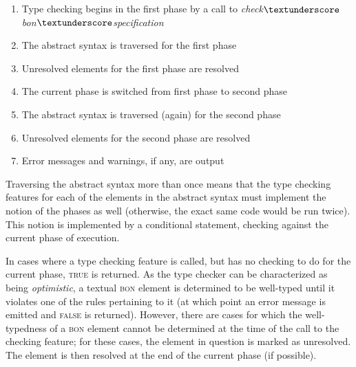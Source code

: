 \begin{enumerate}
\item Type checking begins in the first phase by a call to \textit{check$\textunderscore$bon$\textunderscore$specification}
\item The abstract syntax is traversed for the first phase
\item Unresolved elements for the first phase are resolved
\item The current phase is switched from first phase to second phase
\item The abstract syntax is traversed (again) for the second phase
\item Unresolved elements for the second phase are resolved
\item Error messages and warnings, if any, are output
\end{enumerate}

Traversing the abstract syntax more than once means that the type checking features for each of the elements in the abstract syntax must implement the notion of the phases as well (otherwise, the exact same code would be run twice). This notion is implemented by a conditional statement, checking against the current phase of execution.

In cases where a type checking feature is called, but has no checking to do for the current phase, \textsc{true} is returned. As the type checker can be characterized as being \textit{optimistic}, a textual \textsc{bon} element is determined to be well-typed until it violates one of the rules pertaining to it (at which point an error message is emitted and \textsc{false} is returned). However, there are cases for which the well-typedness of a \textsc{bon} element cannot be determined at the time of the call to the checking feature; for these cases, the element in question is marked as unresolved. The element is then resolved at the end of the current phase (if possible).
